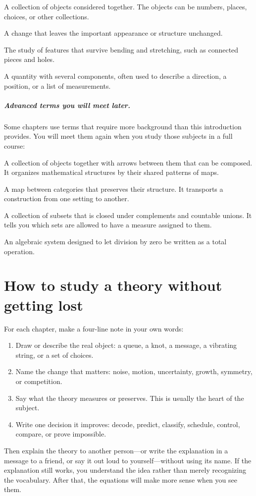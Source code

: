 \documentclass[11pt,oneside]{book}
\begin{document}
\begin{description}[leftmargin=3.0cm,style=nextline]
\item[Set] A collection of objects considered together. The objects can be numbers, places, choices, or other collections.
\item[Symmetry] A change that leaves the important appearance or structure unchanged.
\item[Topology] The study of features that survive bending and stretching, such as connected pieces and holes.
\item[Vector] A quantity with several components, often used to describe a direction, a position, or a list of measurements.
\end{description}

\paragraph{Advanced terms you will meet later.}
Some chapters use terms that require more background than this introduction provides. You will meet them again when you study those subjects in a full course:
\begin{description}[leftmargin=3.0cm,style=nextline]
\item[Category] A collection of objects together with arrows between them that can be composed. It organizes mathematical structures by their shared patterns of maps.
\item[Functor] A map between categories that preserves their structure. It transports a construction from one setting to another.
\item[Sigma-algebra] A collection of subsets that is closed under complements and countable unions. It tells you which sets are allowed to have a measure assigned to them.
\item[Wheel] An algebraic system designed to let division by zero be written as a total operation.
\end{description}

\chapter*{How to study a theory without getting lost}
For each chapter, make a four-line note in your own words:
\begin{enumerate}
\item Draw or describe the real object: a queue, a knot, a message, a vibrating string, or a set of choices.
\item Name the change that matters: noise, motion, uncertainty, growth, symmetry, or competition.
\item Say what the theory measures or preserves. This is usually the heart of the subject.
\item Write one decision it improves: decode, predict, classify, schedule, control, compare, or prove impossible.
\end{enumerate}
Then explain the theory to another person---or write the explanation in a message to a friend, or say it out loud to yourself---without using its name. If the explanation still works, you understand the idea rather than merely recognizing the vocabulary. After that, the equations will make more sense when you see them.
\end{document}
